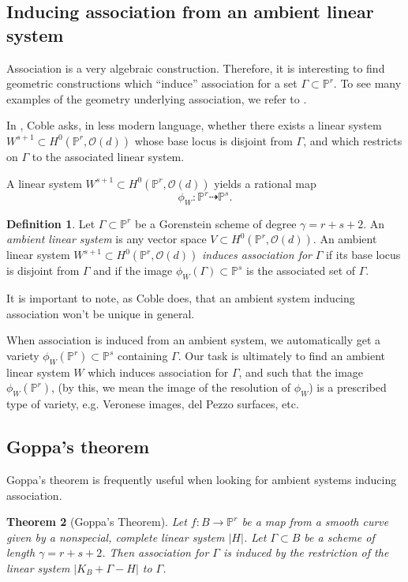\documentclass[reqno, 11pt]{amsart}
\theoremstyle{definition}
\theoremstyle{remark}
\numberwithin{equation}{section}
\numberwithin{thm}{section}
\numberwithin{prop}{section}
\numberwithin{lem}{section}
\numberwithin{cor}{section}
\numberwithin{conj}{section}
\numberwithin{defn}{section}
\renewcommand{\to}{\longrightarrow}
\newcommand {\from}{{\colon}}
\theoremstyle{plain}
\newtheorem{theorem}{Theorem}[section]
\theoremstyle{definition}
\newtheorem{definition}[theorem]{Definition}
\newcommand\bp{{\mathbb P}}
\newcommand\so{{\mathscr O}}
\begin{document}
\subsection{Inducing association from an ambient linear system} Association is a very algebraic construction. Therefore, it is interesting to find geometric constructions which ``induce'' association for a set $\Gamma \subset \bp^{r}$.  To see many examples of the geometry underlying association, we refer to \cite{eisenbudP:the-projective-geometry-of-the-gale-transform}. 

In \cite[p.\ 2]{coble:associated-sets-of-points}, Coble asks, in less modern language, whether there exists a linear system $W^{s+1} \subset H^{0}(\bp^{r}, \so(d))$ whose base locus is disjoint from $\Gamma$, and which restricts on $\Gamma$ to the associated linear system.

A linear system $W^{s+1} \subset H^{0}(\bp^{r}, \so(d))$ yields a rational map \[\phi_{W} \from \bp^{r} \dashrightarrow \bp^{s}.\] 

\begin{definition}
Let $\Gamma \subset \bp^{r}$ be a Gorenstein scheme of degree $\gamma = r+s+2$. 
An {\sl ambient linear system} is any vector space $V \subset  H^{0}(\bp^{r}, \so(d))$.
An ambient linear system $W^{s+1} \subset  H^{0}(\bp^{r}, \so(d))$  {\sl induces association for} $\Gamma$ if its base locus is disjoint from $\Gamma$ and if the image $\phi_{W}(\Gamma) \subset \bp^{s}$ is the associated set of $\Gamma$.  
\end{definition}
  It is important to note, as Coble does, that an ambient system inducing association won't be unique in general.

  When association is induced from an ambient system, we automatically get a variety $\phi_{W}(\bp^{r}) \subset \bp^{s}$ containing $\Gamma$. Our task is ultimately to find an ambient linear system $W$ which induces association  for $\Gamma$, and such that the image $\phi_{W}(\bp^{r})$, (by this, we mean the image of the resolution of $\phi_{W}$) is a prescribed type of variety, e.g. Veronese images, del Pezzo surfaces, etc. 

\subsection{Goppa's theorem} Goppa's theorem is frequently useful when looking for ambient systems inducing association.  

\begin{theorem}[Goppa's Theorem]\label{thm:goppa}
Let $f \from B \to \bp^{r}$ be a map from a smooth curve given by a nonspecial, complete linear system $|H|$. Let $\Gamma \subset B$ be a scheme of length $\gamma = r+s+2$.  Then association for $\Gamma$ is induced by the restriction of the linear system $|K_{B}+\Gamma-H|$ to $\Gamma$.
\end{theorem} 
\end{document}
